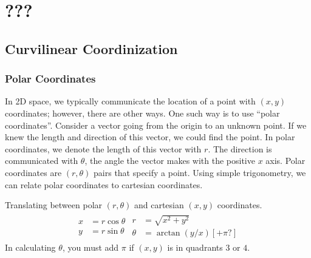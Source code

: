 \documentclass[11pt]{article}
\newenvironment{mybox}
{\begin{tcolorbox}[colback=red!5!white,colframe=red!75!black]}
{\end{tcolorbox}}
\begin{document}
\section{???}
\subsection{Curvilinear Coordinization}
\subsubsection{Polar Coordinates}
In 2D space, we typically communicate the location of a point with $(x,y)$ coordinates; however, there are other ways. One such way is to use ``polar coordinates''. Consider a vector going from the origin to an unknown point. If we knew the length and direction of this vector, we could find the point. In polar coordinates, we denote the length of this vector with $r$. The direction is communicated with $\theta$, the angle the vector makes with the positive $x$ axis. Polar coordinates are $(r,\theta)$ pairs that specify a point.
Using simple trigonometry, we can relate polar coordinates to cartesian coordinates. 
\begin{mybox}
    Translating between polar $(r,\theta)$ and cartesian $(x,y)$ coordinates.
    \begin{align*}
        \begin{split}
        x &= r\cos{\theta}\\
        y &= r\sin{\theta}
        \end{split}
        \begin{split}
        r &= \sqrt{x^2+y^2} \\
        \theta &= \arctan{\left(y/x\right)} [+\pi?]
        \end{split}
    \end{align*}
    In calculating $\theta$, you must add $\pi$ if $(x,y)$ is in quadrants $3$ or $4$.
\end{mybox}
\end{document}
